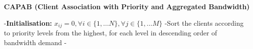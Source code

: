\documentclass[a4paper]{article}
\begin{document}
\begin{algorithm}%
\begin{scriptsize}
\caption{{\bf {\scriptsize CAPAB (Client Association with Priority and Aggregated Bandwidth)}} \label{Algorithm_MABU_prio}}
 -{\bf Initialisation:} $x_{ij}=0, \forall i \in \{1,...N \}, \forall j \in \{ 1,...M \} $\;
 -Sort the clients according to priority levels from the highest, for each level in descending order of bandwidth demand\;
 - 
\end{scriptsize}    
\end{algorithm}
\end{document}
